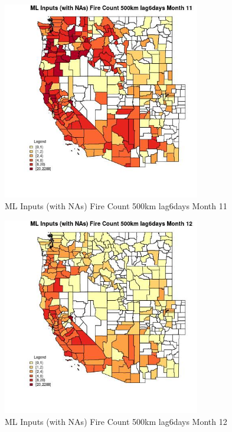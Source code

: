 \begin{figure} 
\centering  
\includegraphics[width=0.77\textwidth]{Code_Outputs/Report_ML_input_PM25_Step4_part_e_de_duplicated_aves_compiled_2019-05-20wNAs_CountyFire_Count_500km_lag6daysmedianMonth11.jpg} 
\caption{\label{fig:Report_ML_input_PM25_Step4_part_e_de_duplicated_aves_compiled_2019-05-20wNAsCountyFire_Count_500km_lag6daysmedianMonth11}ML Inputs (with NAs) Fire Count 500km lag6days Month 11} 
\end{figure} 
 

\begin{figure} 
\centering  
\includegraphics[width=0.77\textwidth]{Code_Outputs/Report_ML_input_PM25_Step4_part_e_de_duplicated_aves_compiled_2019-05-20wNAs_CountyFire_Count_500km_lag6daysmedianMonth12.jpg} 
\caption{\label{fig:Report_ML_input_PM25_Step4_part_e_de_duplicated_aves_compiled_2019-05-20wNAsCountyFire_Count_500km_lag6daysmedianMonth12}ML Inputs (with NAs) Fire Count 500km lag6days Month 12} 
\end{figure} 
 


